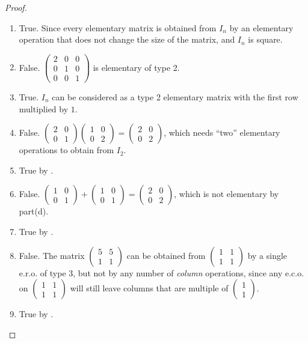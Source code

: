 \begin{proof} \ 

\begin{enumerate}
\item True. Since every elementary matrix is obtained from \(I_n\) by an elementary operation that does not change the size of the matrix, and \(I_n\) is square.
\item False. \(\begin{pmatrix} 2 & 0 & 0 \\ 0 & 1 & 0 \\ 0 & 0 & 1\end{pmatrix}\) is elementary of type 2.
\item True. \(I_n\) can be considered as a type 2 elementary matrix with the first row multiplied by \(1\).
\item False. \(\begin{pmatrix} 2 & 0 \\ 0 & 1 \end{pmatrix} \begin{pmatrix} 1 & 0 \\ 0 & 2 \end{pmatrix} = \begin{pmatrix} 2 & 0 \\ 0 & 2 \end{pmatrix}\), which needs ``two'' elementary operations to obtain from \(I_2\).
\item True by .
\item False. \(\begin{pmatrix} 1 & 0 \\ 0 & 1 \end{pmatrix} + \begin{pmatrix} 1 & 0 \\ 0 & 1 \end{pmatrix} = \begin{pmatrix} 2 & 0 \\ 0 & 2 \end{pmatrix}\), which is not elementary by part(d).
\item True by .
\item False. The matrix \(\begin{pmatrix} 5 & 5 \\ 1 & 1 \end{pmatrix}\) can be obtained from \(\begin{pmatrix} 1 & 1 \\ 1 & 1 \end{pmatrix}\) by a single e.r.o. of type 3, but not by any number of \emph{column} operations, since any e.c.o. on \(\begin{pmatrix} 1 & 1 \\ 1 & 1 \end{pmatrix}\) will still leave columns that are multiple of \(\begin{pmatrix} 1 \\ 1 \end{pmatrix}\).
\item True by .
\end{enumerate}
\end{proof}

